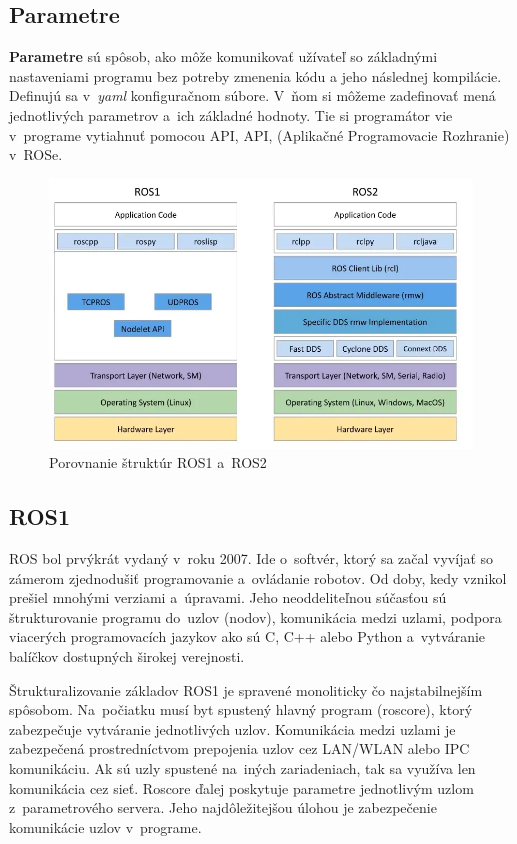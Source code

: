 \subsection{Parametre}
\label{s_parametre}

\textbf{Parametre} sú spôsob, ako môže komunikovať užívateľ so základnými nastaveniami programu bez potreby zmenenia kódu a jeho
následnej kompilácie. Definujú sa v~\textit{yaml} konfiguračnom súbore. V~ňom si môžeme zadefinovať mená jednotlivých parametrov
a~ich základné hodnoty. Tie si programátor vie v~programe vytiahnuť pomocou API, \acrlong{API}, (Aplikačné Programovacie Rozhranie)
v~ROSe.

\begin{figure}[!htbp]
	\centering
	\includegraphics[width=15cm]{img/strukturaRos1Ros2.png}
	\caption{Porovnanie štruktúr ROS1 a~ROS2~\cite{comparison}}
	\label{fig:struktury}
\end{figure}

\subsection{ROS1}

ROS bol prvýkrát vydaný v~roku 2007. Ide o~softvér, ktorý sa začal vyvíjať so zámerom zjednodušiť programovanie a~ovládanie robotov.
Od doby, kedy vznikol prešiel mnohými verziami a~úpravami. Jeho neoddeliteľnou súčasťou sú štrukturovanie programu do~uzlov (nodov),
komunikácia medzi uzlami, podpora viacerých programovacích jazykov ako sú C, C++ alebo Python a~vytváranie balíčkov dostupných širokej
verejnosti.

Štrukturalizovanie základov ROS1 je spravené monoliticky čo najstabilnejším spôsobom. Na~počiatku musí byt spustený hlavný program (roscore),
ktorý zabezpečuje vytváranie jednotlivých uzlov. Komunikácia medzi uzlami je zabezpečená prostredníctvom prepojenia uzlov cez LAN/WLAN
alebo IPC komunikáciu. Ak sú uzly spustené na~iných zariadeniach, tak sa využíva len komunikácia cez sieť. Roscore ďalej poskytuje parametre
jednotlivým uzlom z~parametrového servera. Jeho najdôležitejšou úlohou je zabezpečenie komunikácie uzlov v~programe.

